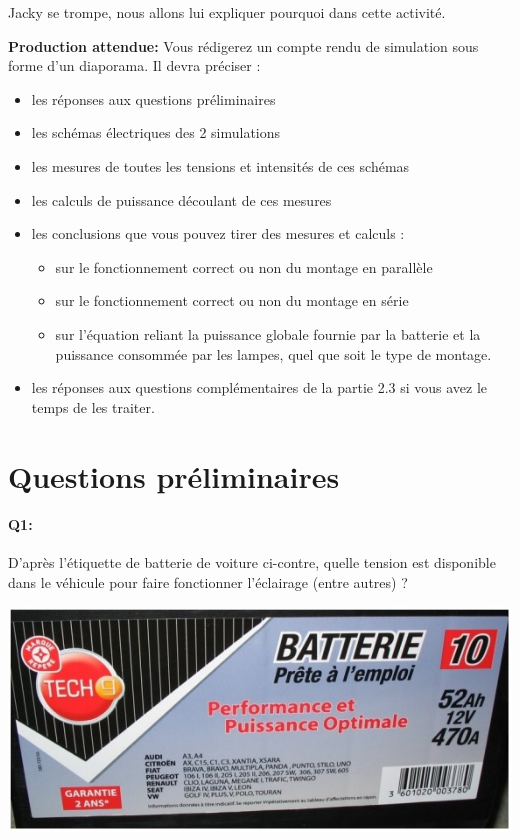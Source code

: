 \documentclass{article}
\begin{document}
Jacky se trompe, nous allons lui expliquer pourquoi dans cette activité.
	

\vspace{2em}
\textbf{Production attendue:} 
Vous rédigerez un compte rendu de simulation sous forme d’un diaporama. Il devra préciser :
\begin{itemize}
	\item les réponses aux questions préliminaires
	\item les schémas électriques des 2 simulations
	\item les mesures de toutes les tensions et intensités de ces schémas
	\item les calculs de puissance découlant de ces mesures
	\item les conclusions que vous pouvez tirer des mesures et calculs :
		\begin{itemize}
			\item sur le fonctionnement correct ou non du montage en parallèle
			\item sur le fonctionnement correct ou non du montage en série
			\item sur l’équation reliant la puissance globale fournie par la batterie et la puissance consommée par les lampes, quel que soit le type de montage.
		\end{itemize}
	\item les réponses aux questions complémentaires de la partie 2.3 si vous avez le temps de les traiter.
\end{itemize}

\vspace{1em}

\section{Questions préliminaires}
\begin{minipage}[b]{0.48\linewidth}
\paragraph{Q1:}
D’après l’étiquette de batterie de voiture ci-contre, quelle tension est disponible dans le véhicule pour faire fonctionner l’éclairage (entre autres) ?
	\vspace{1.5em}
\end{minipage}
\hfill
\begin{minipage}[b]{0.48\linewidth}
	\centering
	\includegraphics[width=.8\linewidth]{./figures/batterie1.png}
\end{minipage}
\end{document}
